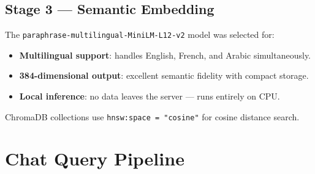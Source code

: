 \documentclass[12pt,a4paper]{report}
\begin{document}
\subsection{Stage 3 — Semantic Embedding}

The \texttt{paraphrase-multilingual-MiniLM-L12-v2} model was selected for:
\begin{itemize}
  \item \textbf{Multilingual support}: handles English, French, and Arabic simultaneously.
  \item \textbf{384-dimensional output}: excellent semantic fidelity with compact storage.
  \item \textbf{Local inference}: no data leaves the server — runs entirely on CPU.
\end{itemize}

ChromaDB collections use \texttt{hnsw:space = "cosine"} for cosine distance search.

\section{Chat Query Pipeline}
\end{document}
